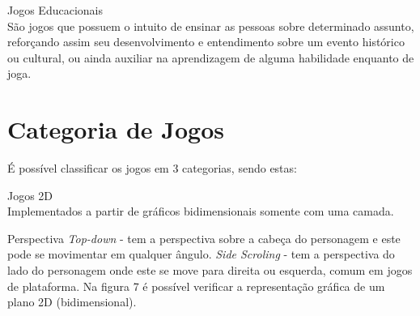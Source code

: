 \pagebreak
\begin{alineascomponto}	
\item Jogos Educacionais\\
São jogos que possuem o intuito de ensinar as pessoas sobre determinado assunto, reforçando assim seu desenvolvimento e entendimento sobre um evento histórico ou cultural, ou ainda auxiliar na aprendizagem de alguma habilidade enquanto de joga. \cite{jd}

\end{alineascomponto}

\section{Categoria de Jogos}
\label{sec:categoria-de-jogos}

É possível classificar os jogos em 3 categorias, sendo estas:
\begin{alineascomponto}

\item Jogos 2D\\
Implementados a partir de gráficos bidimensionais somente com uma camada.

 Perspectiva \textit{ Top-down} - tem a perspectiva sobre a cabeça do personagem e este pode se movimentar em qualquer ângulo.
 \textit{Side Scroling} - tem a perspectiva do lado do personagem onde este se move para direita ou esquerda, comum em jogos de plataforma. Na figura 7 é possível verificar a representação gráfica de um plano 2D (bidimensional). \cite{graf}

\end{alineascomponto}


\begin{figure}[h!]
		\centering
	\end{figure}

